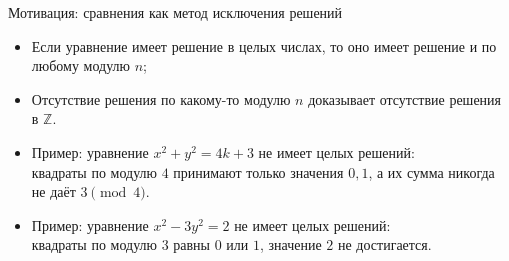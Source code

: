 \documentclass[serif, aspectratio=169]{beamer}
\begin{document}
\begin{frame}{Мотивация: сравнения как метод исключения решений}
    \begin{itemize}
        \item Если уравнение имеет решение в целых числах, то оно имеет решение и по любому модулю $n$;
        \item Отсутствие решения по какому-то модулю $n$ доказывает отсутствие решения в $\mathbb{Z}$.
        \item Пример: уравнение $x^2+y^2=4k+3$ не имеет целых решений:\\ квадраты по модулю $4$ принимают только значения $0,1$, а их сумма никогда не даёт $3\pmod4$.
        \item Пример: уравнение $x^2-3y^2=2$ не имеет целых решений:\\ квадраты по модулю $3$ равны $0$ или $1$, значение $2$ не достигается.
    \end{itemize}
\end{frame}
\end{document}
